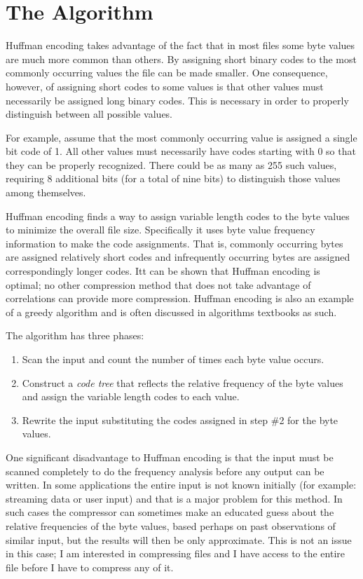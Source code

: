 \documentclass{scrreprt}
\newcommand{\newterm}[1]{\textit{#1}}  %
\begin{document}
\section{The Algorithm}

Huffman encoding takes advantage of the fact that in most files some byte values are much more
common than others. By assigning short binary codes to the most commonly occurring values the
file can be made smaller. One consequence, however, of assigning short codes to some values is
that other values must necessarily be assigned long binary codes. This is necessary in order to
properly distinguish between all possible values.

For example, assume that the most commonly occurring value is assigned a single bit code of 1.
All other values must necessarily have codes starting with 0 so that they can be properly
recognized. There could be as many as 255 such values, requiring 8 additional bits (for a total
of nine bits) to distinguish those values among themselves.

Huffman encoding finds a way to assign variable length codes to the byte values to minimize the
overall file size. Specifically it uses byte value frequency information to make the code
assignments. That is, commonly occurring bytes are assigned relatively short codes and
infrequently occurring bytes are assigned correspondingly longer codes. Itt can be shown that
Huffman encoding is optimal; no other compression method that does not take advantage of
correlations can provide more compression. Huffman encoding is also an example of a greedy
algorithm and is often discussed in algorithms textbooks as such.

The algorithm has three phases:

\begin{enumerate}

\item Scan the input and count the number of times each byte value occurs.

\item Construct a \newterm{code tree} that reflects the relative frequency of the byte values
  and assign the variable length codes to each value.

\item Rewrite the input substituting the codes assigned in step \#2 for the byte values.

\end{enumerate}

One significant disadvantage to Huffman encoding is that the input must be scanned completely to
do the frequency analysis before any output can be written. In some applications the entire
input is not known initially (for example: streaming data or user input) and that is a major
problem for this method. In such cases the compressor can sometimes make an educated guess about
the relative frequencies of the byte values, based perhaps on past observations of similar
input, but the results will then be only approximate. This is not an issue in this case; I am
interested in compressing files and I have access to the entire file before I have to compress
any of it.
\end{document}
